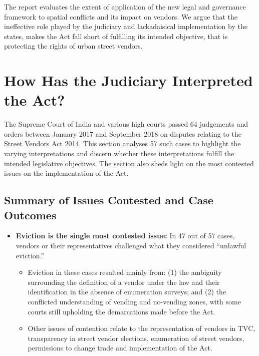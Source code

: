 \documentclass[a4paper, 12pt, twoside]{article}
\begin{document}
{The report evaluates the extent of application of the new legal and governance framework to spatial conflicts and its impact on vendors. We argue that the ineffective role played by the judiciary and lackadaisical implementation by the states, makes the Act fall short of fulfilling its intended objective, that is protecting the rights of urban street vendors.
\section*{How Has the Judiciary Interpreted the Act?}

The Supreme Court of India and various high courts passed 64 judgements and orders between January 2017 and September 2018 on disputes relating to the Street Vendors Act 2014. This section analyses 57 such cases  to highlight the varying interpretations and discern whether these interpretations fulfill the intended legislative objectives. The section also sheds light on the most contested issues on the implementation of the Act.

\subsection*{Summary of Issues Contested and Case Outcomes}

\begin{itemize}[nosep]
\item \textbf{Eviction is the single most contested issue:} In 47 out of 57 cases, vendors or their representatives challenged what they considered “unlawful eviction.”

\begin{itemize}
\item Eviction in these cases resulted mainly from: (1) the ambiguity surrounding the definition of a vendor under the law and their identification in the absence of enumeration surveys; and (2) the conflicted understanding of vending and no-vending zones, with some courts still upholding the demarcations made before the Act.

\item Other issues of contention relate to the representation of vendors in TVC, transparency in street vendor elections, enumeration of street vendors, permissions to change trade and implementation of the Act.


\end{itemize}
\end{itemize}}
\end{document}
